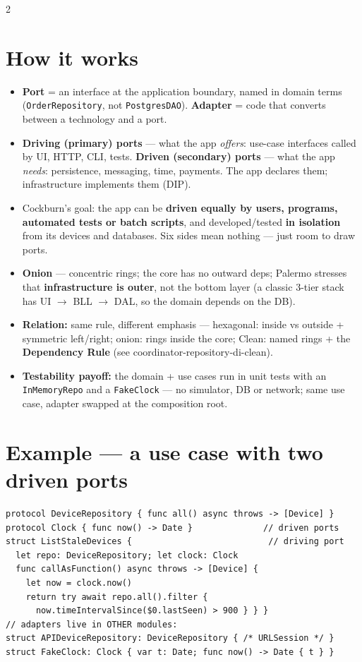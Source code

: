 \documentclass[8pt]{extarticle}
\begin{document}
\begin{multicols}{2}
\raggedright

\section{How it works}
\begin{itemize}
  \item \textbf{Port} = an interface at the application boundary, named in domain terms
        (\texttt{OrderRepository}, not \texttt{PostgresDAO}). \textbf{Adapter} = code
        that converts between a technology and a port.
  \item \textbf{Driving (primary) ports} — what the app \emph{offers}: use-case
        interfaces called by UI, HTTP, CLI, tests. \textbf{Driven (secondary) ports} —
        what the app \emph{needs}: persistence, messaging, time, payments. The app
        declares them; infrastructure implements them (DIP).
  \item Cockburn's goal: the app can be \textbf{driven equally by users, programs,
        automated tests or batch scripts}, and developed/tested \textbf{in isolation}
        from its devices and databases. Six sides mean nothing — just room to draw ports.
  \item \textbf{Onion} — concentric rings; the core has no outward deps; Palermo
        stresses that \textbf{infrastructure is outer}, not the bottom layer (a
        classic 3-tier stack has UI $\to$ BLL $\to$ DAL, so the domain depends on the DB).
  \item \textbf{Relation:} same rule, different emphasis — hexagonal: inside vs
        outside + symmetric left/right; onion: rings inside the core; Clean: named rings
        + the \textbf{Dependency Rule} (see coordinator-repository-di-clean).
  \item \textbf{Testability payoff:} the domain + use cases run in unit tests with an
        \texttt{InMemoryRepo} and a \texttt{FakeClock} — no simulator, DB or network;
        same use case, adapter swapped at the composition root.
\end{itemize}

\section{Example — a use case with two driven ports}
\begin{lstlisting}[language=SwiftSheet]
protocol DeviceRepository { func all() async throws -> [Device] }
protocol Clock { func now() -> Date }              // driven ports
struct ListStaleDevices {                           // driving port
  let repo: DeviceRepository; let clock: Clock
  func callAsFunction() async throws -> [Device] {
    let now = clock.now()
    return try await repo.all().filter {
      now.timeIntervalSince($0.lastSeen) > 900 } } }
// adapters live in OTHER modules:
struct APIDeviceRepository: DeviceRepository { /* URLSession */ }
struct FakeClock: Clock { var t: Date; func now() -> Date { t } }
\end{lstlisting}


\end{multicols}
\end{document}
